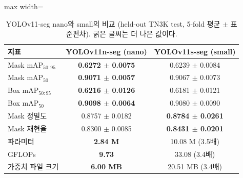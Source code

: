 \begin{table}[htbp]
\centering
\small
\caption[YOLOv11-seg nano와 small의 비교 (held-out TN3K test, 5-fold 평균 $\pm$ 표준편차).]{YOLOv11-seg nano와 small의 비교 (held-out TN3K test, 5-fold 평균 $\pm$ 표준편차). 굵은 글씨는 더 나은 값이다.}
\label{tab:nano_small}
\begin{adjustbox}{max width=\linewidth}
\begin{tabular}{lcc}
\toprule
지표 & YOLOv11n-seg (nano) & YOLOv11s-seg (small) \\
\midrule
Mask mAP$_{50:95}$ & \textbf{0.6272 $\pm$ 0.0075} & 0.6239 $\pm$ 0.0084 \\
Mask mAP$_{50}$ & \textbf{0.9071 $\pm$ 0.0057} & 0.9067 $\pm$ 0.0073 \\
Box mAP$_{50:95}$ & \textbf{0.6216 $\pm$ 0.0126} & 0.6181 $\pm$ 0.0121 \\
Box mAP$_{50}$ & \textbf{0.9098 $\pm$ 0.0064} & 0.9080 $\pm$ 0.0090 \\
Mask 정밀도 & 0.8757 $\pm$ 0.0182 & \textbf{0.8784 $\pm$ 0.0261} \\
Mask 재현율 & 0.8300 $\pm$ 0.0085 & \textbf{0.8431 $\pm$ 0.0201} \\
\midrule
파라미터 & \textbf{2.84 M} & 10.08 M (3.5배) \\
GFLOPs & \textbf{9.73} & 33.08 (3.4배) \\
가중치 파일 크기 & \textbf{6.00 MB} & 20.51 MB (3.4배) \\
\bottomrule
\end{tabular}
\end{adjustbox}
\end{table}
